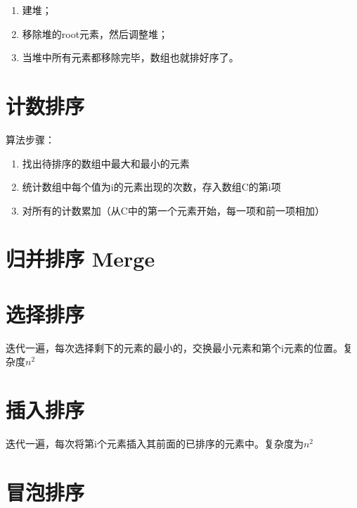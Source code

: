 \begin{enumerate}
\item 建堆；
\item 移除堆的root元素，然后调整堆；
\item 当堆中所有元素都移除完毕，数组也就排好序了。
\end{enumerate}

\section{计数排序}
算法步骤：
\begin{enumerate}
\item 找出待排序的数组中最大和最小的元素
\item 统计数组中每个值为i的元素出现的次数，存入数组C的第i项
\item 对所有的计数累加（从C中的第一个元素开始，每一项和前一项相加）
\end{enumerate}
\section{归并排序 Merge}

\section{选择排序}
迭代一遍，每次选择剩下的元素的最小的，交换最小元素和第个i元素的位置。复杂度$n^2$
\section{插入排序}
迭代一遍，每次将第i个元素插入其前面的已排序的元素中。复杂度为$n^2$

\section{冒泡排序}





